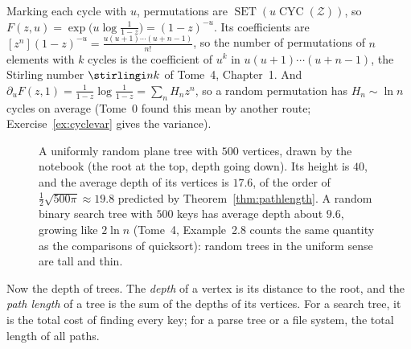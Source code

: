 \begin{example}\label{ex:cyclesbgf}
Marking each cycle with $u$, permutations are $\operatorname{SET}(u\operatorname{CYC}(\mathcal Z))$, so $F(z,u)=\exp\big(u\log\frac1{1-z}\big)=(1-z)^{-u}$. Its coefficients are
$[z^n](1-z)^{-u}=\frac{u(u+1)\cdots(u+n-1)}{n!}$, so the number of permutations of $n$ elements with $k$ cycles is the coefficient of $u^k$ in $u(u+1)\cdots(u+n-1)$, the
Stirling number $\stirlingi nk$ of Tome~4, Chapter~1. And $\partial_uF(z,1)=\frac1{1-z}\log\frac1{1-z}=\sum_nH_nz^n$, so a random permutation has $H_n\sim\ln n$ cycles on average
(Tome~0 found this mean by another route; Exercise~\ref{ex:cyclevar} gives the variance).
\end{example}

\begin{figure}[ht]
\centering
{}
\caption{A uniformly random plane tree with $500$ vertices, drawn by the notebook (the root at the top, depth going down).
Its height is $40$, and the average depth of its vertices is $17.6$, of the order of $\frac12\sqrt{500\pi}\approx19.8$ predicted by Theorem~\ref{thm:pathlength}. A
random binary search tree with $500$ keys has average depth about $9.6$, growing like $2\ln n$ (Tome~4, Example~2.8 counts the same
quantity as the comparisons of quicksort): random trees in the uniform sense are tall and thin.}
\label{fig:randomtree}
\end{figure}

Now the depth of trees. The \emph{depth} of a vertex is its distance to the root, and the \emph{path length} of a tree is the sum of the depths of its
vertices. For a search tree, it is the total cost of finding every key; for a parse tree or a file system, the total length of all
paths.

